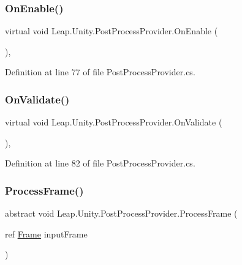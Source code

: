 \subsubsection{\texorpdfstring{OnEnable()}{OnEnable()}}
{\footnotesize\ttfamily virtual void Leap.\+Unity.\+Post\+Process\+Provider.\+On\+Enable (\begin{DoxyParamCaption}{ }\end{DoxyParamCaption})\hspace{0.3cm}{\ttfamily [protected]}, {\ttfamily [virtual]}}



Definition at line 77 of file Post\+Process\+Provider.\+cs.

\mbox{\label{class_leap_1_1_unity_1_1_post_process_provider_a1ca33dd982907638e34a1c126460e689}} 
\subsubsection{\texorpdfstring{OnValidate()}{OnValidate()}}
{\footnotesize\ttfamily virtual void Leap.\+Unity.\+Post\+Process\+Provider.\+On\+Validate (\begin{DoxyParamCaption}{ }\end{DoxyParamCaption})\hspace{0.3cm}{\ttfamily [protected]}, {\ttfamily [virtual]}}



Definition at line 82 of file Post\+Process\+Provider.\+cs.

\mbox{\label{class_leap_1_1_unity_1_1_post_process_provider_aa24a78b3485fd2bbac1d6370dd65ddbe}} 
\subsubsection{\texorpdfstring{ProcessFrame()}{ProcessFrame()}}
{\footnotesize\ttfamily abstract void Leap.\+Unity.\+Post\+Process\+Provider.\+Process\+Frame (\begin{DoxyParamCaption}\item[{ref \mbox{\hyperlink{class_leap_1_1_frame}{Frame}}}]{input\+Frame }\end{DoxyParamCaption})\hspace{0.3cm}{\ttfamily [pure virtual]}}



